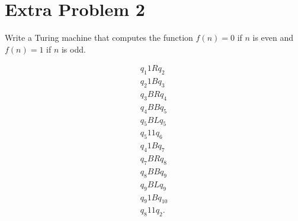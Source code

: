 \documentclass[12pt]{mypackage}
\begin{document}
\section{Extra Problem 2}%
\begin{problem}
  Write a Turing machine that computes the function $f(n) = 0$ if $n$ is even and $f(n) = 1$ if $n$ is odd.
\end{problem}
\begin{solution}
  \begin{align*}
    q_1 1 R q_2\\
    q_2 1 B q_3\\
    q_3 B R q_4\\
    q_4 B B q_5\\
    q_5 B L q_5\\
    q_5 1 1 q_6\\
    q_4 1 B q_7\\
    q_7 B R q_8\\
    q_8 B B q_9\\
    q_9 B L q_9\\
    q_9 1 B q_{10}\\
    q_8 1 1 q_2.
  \end{align*}
  
\end{solution}
\end{document}
